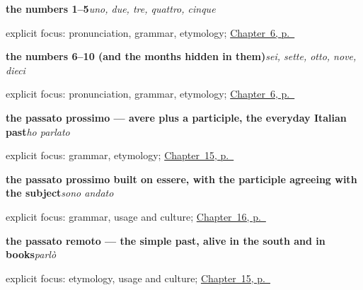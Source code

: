 \noindent\begin{minipage}[t]{\linewidth}
\raggedright
\textbf{the numbers 1–5}\enspace\emph{uno, due, tre, quattro, cinque}\par
\footnotesize explicit focus: pronunciation, grammar, etymology; \hyperref[ch:it-numbers-one-to-ten]{Chapter~6, p.~\pageref*{ch:it-numbers-one-to-ten}}
\end{minipage}\par\smallskip

\noindent\begin{minipage}[t]{\linewidth}
\raggedright
\textbf{the numbers 6–10 (and the months hidden in them)}\enspace\emph{sei, sette, otto, nove, dieci}\par
\footnotesize explicit focus: pronunciation, grammar, etymology; \hyperref[ch:it-numbers-one-to-ten]{Chapter~6, p.~\pageref*{ch:it-numbers-one-to-ten}}
\end{minipage}\par\smallskip

\noindent\begin{minipage}[t]{\linewidth}
\raggedright
\textbf{the passato prossimo — avere plus a participle, the everyday Italian past}\enspace\emph{ho parlato}\par
\footnotesize explicit focus: grammar, etymology; \hyperref[ch:it-two-pasts]{Chapter~15, p.~\pageref*{ch:it-two-pasts}}
\end{minipage}\par\smallskip

\noindent\begin{minipage}[t]{\linewidth}
\raggedright
\textbf{the passato prossimo built on essere, with the participle agreeing with the subject}\enspace\emph{sono andato}\par
\footnotesize explicit focus: grammar, usage and culture; \hyperref[ch:it-essere-andare-past]{Chapter~16, p.~\pageref*{ch:it-essere-andare-past}}
\end{minipage}\par\smallskip

\noindent\begin{minipage}[t]{\linewidth}
\raggedright
\textbf{the passato remoto — the simple past, alive in the south and in books}\enspace\emph{parlò}\par
\footnotesize explicit focus: etymology, usage and culture; \hyperref[ch:it-two-pasts]{Chapter~15, p.~\pageref*{ch:it-two-pasts}}
\end{minipage}\par\smallskip

